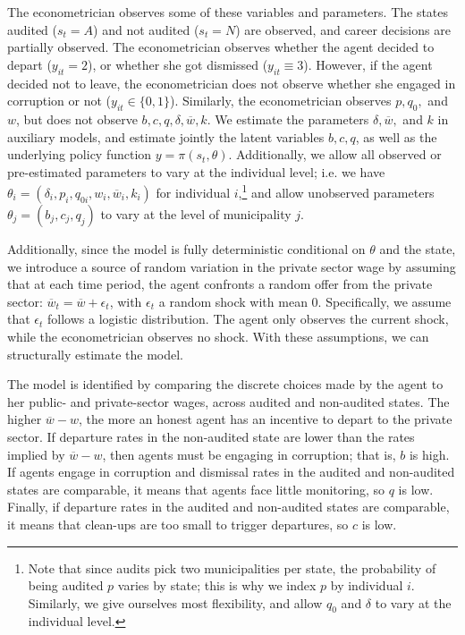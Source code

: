 \documentclass[12pt,a4paper]{article}
\theoremstyle{definition}
\newcommand{\wb}{\overline{w}}
\newcommand{\de}{\delta}
\begin{document}
{The econometrician observes some of these variables and parameters. The states audited ($s_t = A$) and not audited ($s_t = N$) are observed, and career decisions are partially observed. The econometrician observes whether the agent decided to depart ($y_{it} = 2$), or whether she got dismissed ($y_{it} \equiv 3$). However, if the agent decided not to leave, the econometrician does not observe whether she engaged in corruption or not ($y_{it} \in \{0,1\}$). Similarly, the econometrician observes $p, q_0,$ and $w$, but does not observe $b, c, q, \de, \wb, k$. We estimate the parameters $\de, \wb,$ and $k$ in auxiliary models, and estimate jointly the latent variables $b, c, q$, as well as the underlying policy function $y = \pi(s_t, \theta)$. Additionally, we allow all observed or pre-estimated parameters to vary at the individual level; i.e. we have $\theta_i = (\de_i, p_i, q_{0i}, w_i, \wb_i, k_i)$ for individual $i$,\footnote{Note that since audits pick two municipalities per state, the probability of being audited $p$ varies by state; this is why we index $p$ by individual $i$. Similarly, we give ourselves most flexibility, and allow $q_0$ and $\de$ to vary at the individual level.} and allow unobserved parameters $\theta_j = (b_j, c_j, q_j)$ to vary at the level of municipality $j$. 

Additionally, since the model is fully deterministic conditional on $\theta$ and the state, we introduce a source of random variation in the private sector wage by assuming that at each time period, the agent confronts a random offer from the private sector: $\wb_t = \wb + \epsilon_t$, with $\epsilon_t$ a random shock with mean 0. Specifically, we assume that $\epsilon_t$ follows a logistic distribution. The agent only observes the current shock, while the econometrician observes no shock. With these assumptions, we can structurally estimate the model. 

The model is identified by comparing the discrete choices made by the agent to her public- and private-sector wages, across audited and non-audited states. The higher $\wb - w$, the more an honest agent has an incentive to depart to the private sector. If departure rates in the non-audited state are lower than the rates implied by $\wb - w$, then agents must be engaging in corruption; that is, $b$ is high. If agents engage in corruption and dismissal rates in the audited and non-audited states are comparable, it means that agents face little monitoring, so $q$ is low. Finally, if departure rates in the audited and non-audited states are comparable, it means that clean-ups are too small to trigger departures, so $c$ is low. 

}
\end{document}

